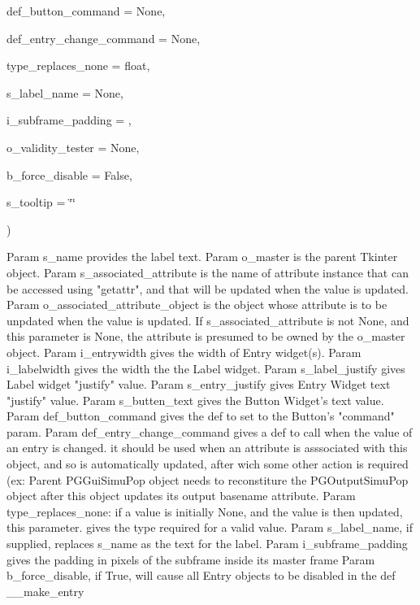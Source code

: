 {\begin{DoxyParamCaption}
\item[{}]{def\+\_\+button\+\_\+command = {\ttfamily None}, }
\item[{}]{def\+\_\+entry\+\_\+change\+\_\+command = {\ttfamily None}, }
\item[{}]{type\+\_\+replaces\+\_\+none = {\ttfamily float}, }
\item[{}]{s\+\_\+label\+\_\+name = {\ttfamily None}, }
\item[{}]{i\+\_\+subframe\+\_\+padding = {}, }
\item[{}]{o\+\_\+validity\+\_\+tester = {\ttfamily None}, }
\item[{}]{b\+\_\+force\+\_\+disable = {\ttfamily False}, }
\item[{}]{s\+\_\+tooltip = {\ttfamily \char`\"{}\char`\"{}}}
\end{DoxyParamCaption}
)}\hypertarget{classnegui_1_1pgguiutilities_1_1KeyValFrame_a42badee6f48e787eb50911528d0381aa}{}\label{classnegui_1_1pgguiutilities_1_1KeyValFrame_a42badee6f48e787eb50911528d0381aa}
\begin{DoxyVerb}Param s_name provides the label text.
Param o_master is the parent Tkinter object.
Param s_associated_attribute is the name of 
    attribute instance that can be accessed
    using "getattr", and that will be
    updated when the value is updated.
Param o_associated_attribute_object is the object whose attribute
    is to be unpdated when the value is updated.  If
    s_associated_attribute is not None, and this parameter
    is None, the attribute is presumed to be
    owned by the o_master object.
Param i_entrywidth gives the width of Entry widget(s).
Param i_labelwidth gives the width the the Label widget.
Param s_label_justify gives Label widget "justify" value.
Param s_entry_justify gives Entry Widget text "justify" value.
Param s_butten_text gives the Button Widget's text value.
Param def_button_command gives the def to set to the Button's "command" param.
Param def_entry_change_command gives a def to call when the value of an entry is changed.             
      it should be used when an attribute is asssociated with this object,
      and so is automatically updated, after wich some other action is required 
      (ex: Parent PGGuiSimuPop object needs to reconstiture the PGOutputSimuPop object 
      after this object updates its output basename attribute.
Param type_replaces_none: if a value is initially None, and the value is then updated, 
      this parameter.
      gives the type required for a valid value.
Param s_label_name, if supplied, replaces s_name as the text for the label.
Param i_subframe_padding gives the padding in pixels of the subframe inside its master frame
Param b_force_disable, if True, will cause all Entry objects to be disabled 
      in the def __make_entry\end{DoxyVerb}
 

